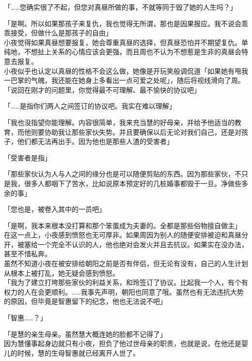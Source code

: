 「……您确实很了不起，但您对真昼所做的事，不就等同于毁了她的人生吗？」

「是啊。所以如果那孩子来复仇，我也觉得无所谓，那也是因果报应。我不说会乖乖接受，但做什么是那孩子的自由」\\

小夜觉得如果真昼想要报复，她会尊重真昼的选择，但真昼恐怕并不期望复仇。单纯地，不想扯上关系的心情应该会更强，而且周也不认为不想惹是生非的真昼会特意去报复。\\

小夜似乎也认定以真昼的性格不会这么做，她像是开玩笑般调侃道「如果她有甩我一巴掌的气魄，我还能在她身上多看出一点可爱之处呢」，随后将视线滑向了周。\\

「说回在刚才的问题里，你觉得最不可理解、最不愉快的协议吧」

「……是指你们两人之间签订的协议吧。我实在难以理解」

「我也没指望你能理解。内容很简单，我来充当慧的好母亲，并给予他适当的教育，而他则要协助我让那些家伙失势。并且要确保以后无论对我们自己，还是对孩子，他们都无法再出手。因为他也是那些人渣的受害者」

「受害者是指」

「那些家伙认为人与人之间的缘分也是可以随便剪贴的东西。因为那些家伙，不只是我，很多人都咽下了苦水，比如说原本预定好的几桩婚事都毁于一旦。净做些多余的事」

「您也是，被卷入其中的一员吧」

「是啊，我本来根本没打算和那个笨蛋成为夫妻的。全都是那些俗物擅自做主」\\

在这一点上，小夜感到愤怒也无可厚非。如果周因为别人的随便安排被迫和真昼分开，被塞给一个完全不认识的人，他也绝对会发火并且去抗议。如果实在没办法，甚至不惜私奔。\\

虽然不知道小夜在被安排给朝阳之前是否有伴侣，但无论有没有，自己的人生计划从根本上被打乱，她无疑会感到愤怒。\\

「我为了建立打垮那些家伙的利益关系，和玲签订了协议。比起我一个人，有个有权力的人在会更顺利。……我事先声明，朝阳也同意了哦。虽然也有无法违抗大势的原因，但毕竟是智惠留下的纪念，他也无法说不吧」

「智惠……？」

「是慧的亲生母亲。虽然慧大概连她的脸都不记得了」\\

因为慧懂事起身边就只有小夜，担负了他过世母亲的职责，也就是说，在他还是婴儿的时候，慧的生母智惠就已经离开人世了。\\

